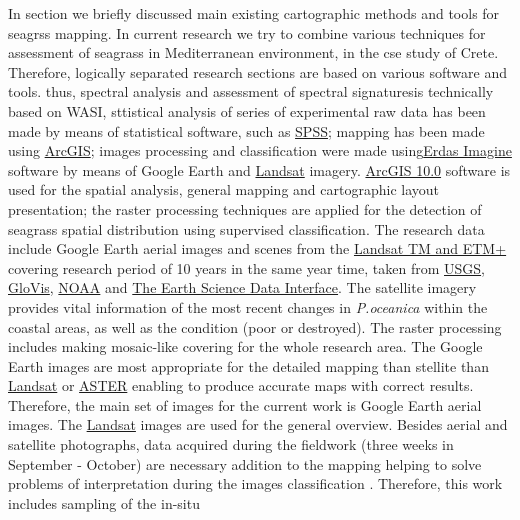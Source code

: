 \documentclass[10pt, a4paper]{article}
\begin{document}
In section  we briefly discussed main existing cartographic methods and tools for seagrss mapping. In current  research we try to combine various techniques for assessment of seagrass in Mediterranean environment, in the cse study of Crete. Therefore, logically separated research sections are based on various software and tools. thus, spectral analysis and assessment of spectral signaturesis technically based on WASI, sttistical analysis of series of experimental raw data has been made by means of statistical software, such as \href{http://www.spss.com/}{SPSS}; mapping has been made using  \href{http://www.esri.com/software/arcgis/index.html}{ArcGIS}; images processing and classification were made using\href{http://www.erdas.com/products/ERDASIMAGINE/ERDASIMAGINE/Details.aspx}{Erdas Imagine} software by means of Google Earth and  \href{http://landsat.gsfc.nasa.gov/}{Landsat} imagery.
\href{http://www.esri.com/software/arcgis/index.html}{ArcGIS 10.0} software is used for the spatial analysis, general mapping and cartographic layout
presentation; the raster processing techniques are applied for the detection of seagrass spatial
distribution using supervised classification.
The research data include Google Earth aerial images and scenes from the \href{http://landsat.gsfc.nasa.gov/}{Landsat TM and ETM+}
covering research period of 10 years in the same year time, taken from \href{http://www.usgs.gov/pubprod/}{USGS}, \href{http://glovis.usgs.gov/}{GloVis}, \href{http://www.osdpd.noaa.gov/ml/index.html}{NOAA} and \href{http://glcfapp.glcf.umd.edu:8080/esdi/index.jsp}{The Earth Science Data Interface}. 
The satellite imagery provides
vital information of the most recent changes in \textit{P.oceanica} within the coastal areas, as well as the
condition (poor or destroyed).
The raster processing includes making mosaic-like covering for the whole research area. The Google
Earth images are most appropriate for the detailed mapping than stellite than \href{http://landsat.gsfc.nasa.gov/}{Landsat} or \href{http://asterweb.jpl.nasa.gov/}{ASTER} enabling to produce accurate maps with correct results. Therefore, the main set of images for the
current work is Google Earth aerial images. The  \href{http://landsat.gsfc.nasa.gov/}{Landsat} images are used for the general overview.
Besides aerial and satellite photographs, data acquired during the fieldwork (three weeks in September - October) are
necessary addition to the mapping helping to solve problems of interpretation during the images
classification \cite{Pasqualini98a}\label{Pasqualini98a}. Therefore, this work includes sampling of the in-situ
\end{document}
